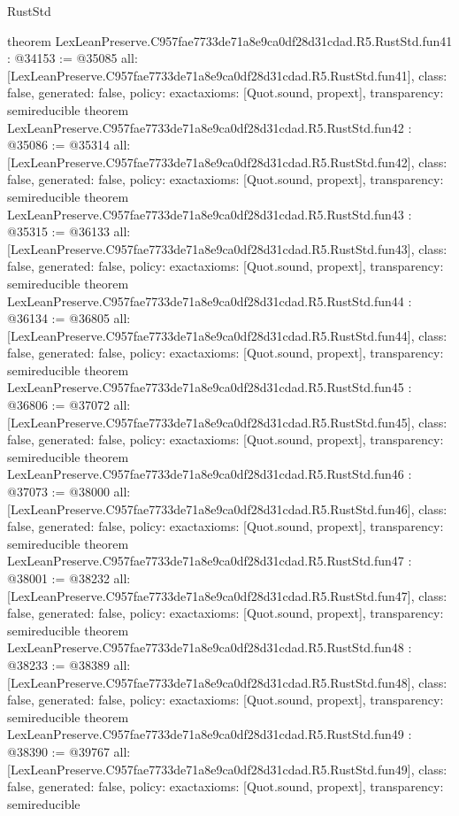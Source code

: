 \begin{lexlean}{RustStd}
\begin{coremodule}
{}
theorem LexLeanPreserve.C957fae7733de71a8e9ca0df28d31cdad.R5.RustStd.fun41 : @34153 := @35085 {
  all: [LexLeanPreserve.C957fae7733de71a8e9ca0df28d31cdad.R5.RustStd.fun41],
  class: false,
  generated: false,
  policy: exact{axioms: [Quot.sound, propext]},
  transparency: semireducible
}
theorem LexLeanPreserve.C957fae7733de71a8e9ca0df28d31cdad.R5.RustStd.fun42 : @35086 := @35314 {
  all: [LexLeanPreserve.C957fae7733de71a8e9ca0df28d31cdad.R5.RustStd.fun42],
  class: false,
  generated: false,
  policy: exact{axioms: [Quot.sound, propext]},
  transparency: semireducible
}
theorem LexLeanPreserve.C957fae7733de71a8e9ca0df28d31cdad.R5.RustStd.fun43 : @35315 := @36133 {
  all: [LexLeanPreserve.C957fae7733de71a8e9ca0df28d31cdad.R5.RustStd.fun43],
  class: false,
  generated: false,
  policy: exact{axioms: [Quot.sound, propext]},
  transparency: semireducible
}
theorem LexLeanPreserve.C957fae7733de71a8e9ca0df28d31cdad.R5.RustStd.fun44 : @36134 := @36805 {
  all: [LexLeanPreserve.C957fae7733de71a8e9ca0df28d31cdad.R5.RustStd.fun44],
  class: false,
  generated: false,
  policy: exact{axioms: [Quot.sound, propext]},
  transparency: semireducible
}
theorem LexLeanPreserve.C957fae7733de71a8e9ca0df28d31cdad.R5.RustStd.fun45 : @36806 := @37072 {
  all: [LexLeanPreserve.C957fae7733de71a8e9ca0df28d31cdad.R5.RustStd.fun45],
  class: false,
  generated: false,
  policy: exact{axioms: [Quot.sound, propext]},
  transparency: semireducible
}
theorem LexLeanPreserve.C957fae7733de71a8e9ca0df28d31cdad.R5.RustStd.fun46 : @37073 := @38000 {
  all: [LexLeanPreserve.C957fae7733de71a8e9ca0df28d31cdad.R5.RustStd.fun46],
  class: false,
  generated: false,
  policy: exact{axioms: [Quot.sound, propext]},
  transparency: semireducible
}
theorem LexLeanPreserve.C957fae7733de71a8e9ca0df28d31cdad.R5.RustStd.fun47 : @38001 := @38232 {
  all: [LexLeanPreserve.C957fae7733de71a8e9ca0df28d31cdad.R5.RustStd.fun47],
  class: false,
  generated: false,
  policy: exact{axioms: [Quot.sound, propext]},
  transparency: semireducible
}
theorem LexLeanPreserve.C957fae7733de71a8e9ca0df28d31cdad.R5.RustStd.fun48 : @38233 := @38389 {
  all: [LexLeanPreserve.C957fae7733de71a8e9ca0df28d31cdad.R5.RustStd.fun48],
  class: false,
  generated: false,
  policy: exact{axioms: [Quot.sound, propext]},
  transparency: semireducible
}
theorem LexLeanPreserve.C957fae7733de71a8e9ca0df28d31cdad.R5.RustStd.fun49 : @38390 := @39767 {
  all: [LexLeanPreserve.C957fae7733de71a8e9ca0df28d31cdad.R5.RustStd.fun49],
  class: false,
  generated: false,
  policy: exact{axioms: [Quot.sound, propext]},
  transparency: semireducible
}
\end{coremodule}
\end{lexlean}
